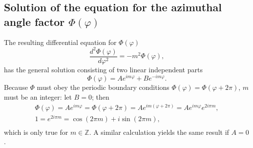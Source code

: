 \subsection{Solution of the equation  for the azimuthal angle factor $\Phi(\varphi )$}

The  resulting differential equation  for $\Phi(\varphi )$
\begin{equation}
\frac{   d   ^2\Phi(\varphi )}{   d    \varphi^2 }
=  -m^2\Phi(\varphi),
\label{2011-m-ch-qaephi}
\end{equation}
has the general solution consisting of two linear independent parts
\begin{equation}
\Phi(\varphi) = A e^{im\varphi}+B e^{-im\varphi}.
\label{2011-m-ch-qae11}
\end{equation}
Because $\Phi$ must obey the periodic boundary conditions $\Phi(\varphi)=\Phi(\varphi  +2\pi)$,
$m$ must be an integer: let $B=0$; then
 \begin{equation}
\begin{split}
\Phi(\varphi)= Ae^{im\varphi} =\Phi(\varphi  +2\pi) = Ae^{im(\varphi  +2\pi)} = Ae^{im\varphi}e^{2i\pi m}  ,\\
1  =  e^{2i\pi m}  = \cos (2 \pi m) +i \sin (2 \pi m)  ,\\
\end{split}
\label{2018-mm-ch-sf-acin}
\end{equation}
which is only true for $m\in \mathbb{Z}$. A similar calculation yields the same result if $A=0$.



